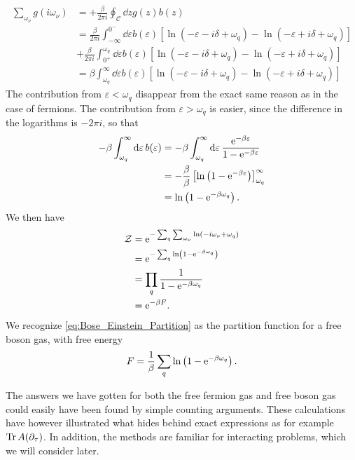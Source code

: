 \begin{align}
\sum_{\omega_\nu}g(i\omega_\nu) &= +\frac{\beta}{2\pi i}\oint_\mathcal{C}\dd{z} g(z)b(z)\nonumber \\
&= \frac{\beta}{2\pi i}\int_{-\infty}^{0^-}\dd{\varepsilon}b(\varepsilon)\left[\ln(-\varepsilon - i\delta +\omega_q)-\ln(-\varepsilon +i\delta + \omega_q)\right] \nonumber\\
&+ \frac{\beta}{2\pi i}\int_{0^+}^{\omega_q}\dd{\varepsilon}b(\varepsilon)\left[\ln(-\varepsilon - i\delta +\omega_q)-\ln(-\varepsilon +i\delta + \omega_q)\right] \nonumber\\
&= \beta\int_{\omega_q}^\infty \dd{\varepsilon}b(\varepsilon)\left[\ln(-\varepsilon - i\delta +\omega_q)-\ln(-\varepsilon +i\delta + \omega_q)\right]\label{unc:limits_integral}
\end{align}
The contribution from \(\varepsilon <\omega_q\) disappear from the exact same reason as in the case of fermions. The contribution from \(\varepsilon >\omega_q\) is easier, since the difference in the logarithms is \(-2\pi i\), so that 
\begin{align*}
-\beta\int_{\omega_q}^{\infty}\dd{\varepsilon}b(\varepsilon) &= -\beta\int_{\omega_q}^{\infty}\dd{\varepsilon}\frac{\mathrm{e}^{-\beta \varepsilon}}{1-\mathrm{e}^{-\beta \varepsilon}}\\
&= -\frac{\beta}{\beta}\left[\ln\left(1-\mathrm{e}^{-\beta \varepsilon}\right)\right]_{\omega_q}^{\infty} \\
&= \ln\left(1-\mathrm{e}^{-\beta\omega_q}\right).
\end{align*}
We then have
\begin{align}
\mathcal{Z} &= \mathrm{e}^{-\sum_{q}\sum_{\omega_\nu}\ln(-i\omega_\nu+\omega_q)} \nonumber\\
&= \mathrm{e}^{-\sum_q\ln\left(1-\mathrm{e}^{-\beta\omega_q}\right)} \nonumber \\
&= \prod_q \frac{1}{1-\mathrm{e}^{-\beta\omega_q}}\label{eq:Bose_Einstein_Partition}\\
&= \mathrm{e}^{-\beta F}. \nonumber
\end{align}
We recognize \eqref{eq:Bose_Einstein_Partition} as the partition function for a free boson gas, with free energy 
\begin{equation}
F = \frac{1}{\beta}\sum_q\ln\left(1-\mathrm{e}^{-\beta\omega_q}\right).
\end{equation}

The answers we have gotten for both the free fermion gas and free boson gas could easily have been found by simple counting arguments. These calculations have however illustrated what hides behind exact expressions as for example \(\Tr A(\partial_\tau)\). In addition, the methods are familiar for interacting problems, which we will consider later.

\begin{figure}
	\centering
	
\end{figure}
